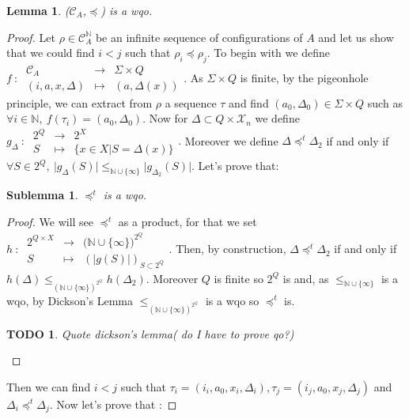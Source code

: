 \documentclass[a4paper,10pt]{report}
\newtheorem{lm}{Lemma}[thr]
\newtheorem{slm}{Sublemma}[lm]
\newtheorem{td}{TODO}
\newcommand{\dmap}[5]{
#1~:~\begin{array}{ccccc}
#2 &\to& #3 \\
#4  &\mapsto& #5
\end{array}}
\newcommand{\C}{\mathcal{C}_{A}}
\newcommand{\X}{\mathcal{X}_{n}}
\begin{document}
\begin{lm} \label{cd1}
  ($\C$,$\preceq$) is a wqo.
\end{lm}

\begin {proof}
Let $\rho \in \C^{\mathbb N}$ be an infinite sequence of configurations of $A$ and let us show that we could find $i < j$ such that $\rho_i \preceq \rho_j$.
To begin with we define
$\dmap{f}{\C}{\Sigma \times Q}{(i,a,x,\Delta)}{(a,\Delta(x))}$.
As $\Sigma \times Q$ is finite, by the pigeonhole principle, we can extract from $\rho$ a sequence $\tau$ and find $(a_0,\Delta_0) \in \Sigma \times Q$ such as 
$\forall i \in \mathbb N,\ f(\tau_i)=(a_0,\Delta_0)$.
Now for $\Delta \subset Q \times \X $ we define $\dmap{g_\Delta}{2^Q}{2^X}{S}{\{ x \in X | S=\Delta(x) \}} .$
Moreover we define $\Delta \preceq^t \Delta_2$ if and only if $\forall S \in 2^Q,\ \lvert g_\Delta(S) \lvert \leq_{\mathbb N \cup \{\infty\}} \lvert g_{\Delta_2}(S) \lvert$. Let's prove that: 
\begin{slm}
  $\preceq^t$ is a wqo.
\end{slm}
\begin{proof}
We will see $\preceq^t$ as a product, for that we set $ \dmap{h}{2^{Q\times X}}{({\mathbb N \cup \{\infty\})}^{2^Q}}{S}{(|g(S)|)_{S\subset {2^Q} }}.$
Then, by construction, $\Delta \preceq^t \Delta_2$ if and only if $ h(\Delta) \leq_{{(\mathbb N \cup \{\infty\})}^{2^Q}} h(\Delta_2)$.
Moreover $Q$ is finite so $2^Q$ is and, as $\leq_{\mathbb N \cup \{\infty\}}$ is a wqo, by Dickson's Lemma $\leq_{{(\mathbb N \cup \{\infty\})}^{2^Q}}$
is a wqo so $\preceq^t$ is.
\begin{td}
  Quote dickson's lemma( do I have to prove qo?) 
\end{td}
\end{proof}
Then we can find $i < j$ such that $\tau_i=(i_i,a_0,x_i,\Delta_i), \tau_j=(i_j,a_0,x_j,\Delta_j)$ and $\Delta_i \preceq^t \Delta_j$.
Now let's prove that :


\end{proof}
\end{document}
